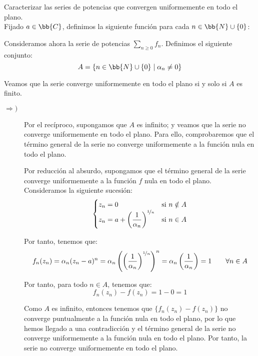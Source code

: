 \begin{ejercicio}
    Caracterizar las series de potencias que convergen uniformemente en todo el plano.\\

    Fijado $a\in \bb{C}$, definimos la siguiente función para cada $n\in \bb{N}\cup \{0\}$:

    Consideramos ahora la serie de potencias $\displaystyle \sum_{n \geq 0}f_n$. Definimos el siguiente conjunto:
    \begin{equation*}
        A=\left\{n\in \bb{N}\cup \{0\}\mid \alpha_n\neq 0\right\}
    \end{equation*}

    Veamos que la serie converge uniformemente en todo el plano si y solo si $A$ es finito.
    \begin{description}
        \item[$\Longrightarrow)$] Por el recíproco, supongamos que $A$ es infinito; y veamos que la serie no converge uniformemente en todo el plano. Para ello, comprobaremos que el término general de la serie no converge uniformemente a la función nula en todo el plano.
        
        Por reducción al absurdo, supongamos que el término general de la serie converge uniformemente a la función $f$ nula en todo el plano.
        Consideramos la siguiente sucesión:
        \begin{equation*}
            \begin{cases}
                z_n = 0 & \text{si } n\notin A\\
                z_n = a+\left(\dfrac{1}{\alpha_n}\right)^{\nicefrac{1}{n}} & \text{si } n\in A
            \end{cases}
        \end{equation*}

        Por tanto, tenemos que:
        \begin{equation*}
            f_n(z_n)=\alpha_n(z_n-a)^n = \alpha_n\left(\left(\dfrac{1}{\alpha_n}\right)^{\nicefrac{1}{n}}\right)^n = \alpha_n\left(\dfrac{1}{\alpha_n}\right) = 1 \qquad \forall n\in A
        \end{equation*}

        Por tanto, para todo $n\in A$, tenemos que:
        \begin{equation*}
            f_n(z_n)-f(z_n) = 1-0 = 1
        \end{equation*}

        Como $A$ es infinito, entonces tenemos que $\{f_n(z_n)-f(z_n)\}$ no converge puntualmente a la función nula en todo el plano, por lo que hemos llegado a una contradicción y el término general de la serie no converge uniformemente a la función nula en todo el plano. Por tanto, la serie no converge uniformemente en todo el plano.


\end{description}
\end{ejercicio}
